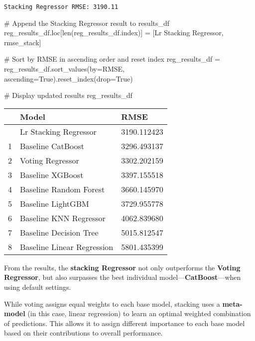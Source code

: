 \documentclass[
  letterpaper,
  DIV=11,
  numbers=noendperiod]{scrreprt}
\newenvironment{Shaded}{\begin{snugshade}}{\end{snugshade}}
\newcommand{\BuiltInTok}[1]{\textcolor[rgb]{0.00,0.23,0.31}{#1}}
\newcommand{\CommentTok}[1]{\textcolor[rgb]{0.37,0.37,0.37}{#1}}
\newcommand{\NormalTok}[1]{\textcolor[rgb]{0.00,0.23,0.31}{#1}}
\newcommand{\OperatorTok}[1]{\textcolor[rgb]{0.37,0.37,0.37}{#1}}
\newcommand{\StringTok}[1]{\textcolor[rgb]{0.13,0.47,0.30}{#1}}
\newcommand{\VariableTok}[1]{\textcolor[rgb]{0.07,0.07,0.07}{#1}}
\begin{document}
\begin{verbatim}
Stacking Regressor RMSE: 3190.11
\end{verbatim}

\begin{Shaded}
\begin{Highlighting}[]
\CommentTok{\# Append the Stacking Regressor result to results\_df}
\NormalTok{reg\_results\_df.loc[}\BuiltInTok{len}\NormalTok{(reg\_results\_df.index)] }\OperatorTok{=}\NormalTok{ [}\StringTok{\textquotesingle{}Lr Stacking Regressor\textquotesingle{}}\NormalTok{, rmse\_stack]}

\CommentTok{\# Sort by RMSE in ascending order and reset index}
\NormalTok{reg\_results\_df }\OperatorTok{=}\NormalTok{ reg\_results\_df.sort\_values(by}\OperatorTok{=}\StringTok{\textquotesingle{}RMSE\textquotesingle{}}\NormalTok{, ascending}\OperatorTok{=}\VariableTok{True}\NormalTok{).reset\_index(drop}\OperatorTok{=}\VariableTok{True}\NormalTok{)}

\CommentTok{\# Display updated results}
\NormalTok{reg\_results\_df}
\end{Highlighting}
\end{Shaded}

\begin{longtable}[]{@{}lll@{}}
\toprule\noalign{}
& Model & RMSE \\
\midrule\noalign{}
\endhead
\bottomrule\noalign{}
\endlastfoot
0 & Lr Stacking Regressor & 3190.112423 \\
1 & Baseline CatBoost & 3296.493137 \\
2 & Voting Regressor & 3302.202159 \\
3 & Baseline XGBoost & 3397.155518 \\
4 & Baseline Random Forest & 3660.145970 \\
5 & Baseline LightGBM & 3729.955778 \\
6 & Baseline KNN Regressor & 4062.839680 \\
7 & Baseline Decision Tree & 5015.812547 \\
8 & Baseline Linear Regression & 5801.435399 \\
\end{longtable}

From the results, the \textbf{stacking Regressor} not only outperforms
the \textbf{Voting Regressor}, but also surpasses the best individual
model---\textbf{CatBoost}---when using default settings.

While voting assigns equal weights to each base model, stacking uses a
\textbf{meta-model} (in this case, linear regression) to learn an
optimal weighted combination of predictions. This allows it to assign
different importance to each base model based on their contributions to
overall performance.
\end{document}
